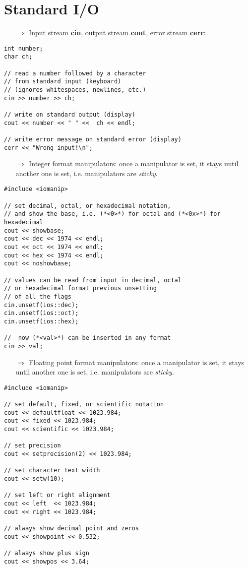 \documentclass[10pt]{article}
\begin{document}
\section{Standard I/O}
\small
\begin{enumerate}
\item[$\Rightarrow$] Input stream \textbf{cin}, output stream \textbf{cout}, error stream \textbf{cerr}:
\end{enumerate}
\begin{lstlisting}
int number;
char ch;

// read a number followed by a character
// from standard input (keyboard)
// (ignores whitespaces, newlines, etc.)
cin >> number >> ch;

// write on standard output (display)
cout << number << " " <<  ch << endl;

// write error message on standard error (display)
cerr << "Wrong input!\n";
\end{lstlisting}
\begin{enumerate}
\item[$\Rightarrow$] Integer format manipulators: once a  manipulator is set, it stays until another one is set, i.e. manipulators are \emph{sticky}.
\end{enumerate}
\begin{lstlisting}
#include <iomanip>

// set decimal, octal, or hexadecimal notation,
// and show the base, i.e. (*<0>*) for octal and (*<0x>*) for hexadecimal
cout << showbase;
cout << dec << 1974 << endl;
cout << oct << 1974 << endl;
cout << hex << 1974 << endl;
cout << noshowbase;

// values can be read from input in decimal, octal
// or hexadecimal format previous unsetting
// of all the flags
cin.unsetf(ios::dec);
cin.unsetf(ios::oct);
cin.unsetf(ios::hex);

//  now (*<val>*) can be inserted in any format
cin >> val;
\end{lstlisting}
\begin{enumerate}
\item[$\Rightarrow$] Floating point format manipulators:  once a  manipulator is set, it stays until another one is set, i.e. manipulators are \emph{sticky}.
\end{enumerate}
\begin{lstlisting}
#include <iomanip>

// set default, fixed, or scientific notation
cout << defaultfloat << 1023.984;
cout << fixed << 1023.984;
cout << scientific << 1023.984;

// set precision
cout << setprecision(2) << 1023.984;

// set character text width
cout << setw(10);

// set left or right alignment
cout << left  << 1023.984;
cout << right << 1023.984;

// always show decimal point and zeros
cout << showpoint << 0.532;

// always show plus sign
cout << showpos << 3.64;
\end{lstlisting}
\end{document}
